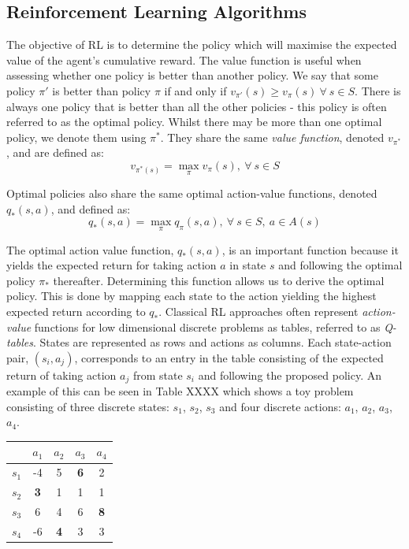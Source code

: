 \documentclass[a4paper]{article}
\begin{document}
\subsection{Reinforcement Learning Algorithms}
The objective of RL is to determine the policy which will maximise the expected value of the agent's cumulative reward. The value function is useful when assessing whether one policy is better than another policy. We say that some policy $\pi'$ is better than policy $\pi$ if and only if $v_{\pi'}(s) \geq v_{\pi}(s) \ \forall \ s \in S$. There is always one policy that is better than all the other policies - this policy is often referred to as the optimal policy. Whilst there may be more than one optimal policy, we denote them using $\pi^*$. They share the same \textit{value function}, denoted $v_{\pi^*}$, and are defined as:
\begin{equation}
v_{\pi^*(s)} = \max_{\pi} v_{\pi}(s), \ \forall \ s \in S
\end{equation}

Optimal policies also share the same optimal action-value functions, denoted $q_*(s,a)$, and defined as:
\begin{equation}
q_*(s,a) = \max_{\pi} q_{\pi}(s,a), \ \forall \ s \in S, \ a \in A(s)
\end{equation}

The optimal action value function, $q_*(s,a)$, is an important function because it yields the expected return for taking action $a$ in state $s$ and following the optimal policy $\pi_*$ thereafter. Determining this function allows us to derive the optimal policy. This is done by mapping each state to the action yielding the highest expected return according to $q_*$. Classical RL approaches often represent \textit{action-value} functions for low dimensional discrete problems as tables, referred to as \textit{Q-tables}. States are represented as rows and actions as columns. Each state-action pair, $(s_i, a_j)$, corresponds to an entry in the table consisting of the expected return of taking action $a_j$ from state $s_i$ and following the proposed policy. An example of this can be seen in Table XXXX which shows a toy problem consisting of three discrete states: $s_1$, $s_2$, $s_3$ and four discrete actions: $a_1$, $a_2$, $a_3$, $a_4$.\\

\begin{table}[h]
\centering
{}
\begin{tabular}{|c|c|c|c|c|}
\hline
 & $a_1$ & $a_2$ & $a_3$ & $a_4$\\
\hline
$s_1$ & -4 & 5 & \textbf{6} & 2 \\
\hline
$s_2$ & \textbf{3} & 1 & 1 & 1 \\
\hline
$s_3$ & 6 & 4 & 6 & \textbf{8} \\
\hline
$s_4$ & -6 & \textbf{4} & 3 & 3 \\
\hline
\end{tabular}
\end{table}
\end{document}
